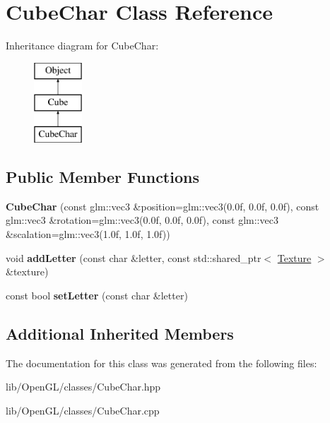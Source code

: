 \hypertarget{class_cube_char}{}\section{Cube\+Char Class Reference}
\label{class_cube_char}
Inheritance diagram for Cube\+Char\+:\begin{figure}[H]
\begin{center}
\leavevmode
\includegraphics[height=3.000000cm]{class_cube_char}
\end{center}
\end{figure}
\subsection*{Public Member Functions}
\begin{DoxyCompactItemize}
\item 
\mbox{\label{class_cube_char_af247c30c0f327f6324efd2218ea2cad3}} 
{\bfseries Cube\+Char} (const glm\+::vec3 \&position=glm\+::vec3(0.\+0f, 0.\+0f, 0.\+0f), const glm\+::vec3 \&rotation=glm\+::vec3(0.\+0f, 0.\+0f, 0.\+0f), const glm\+::vec3 \&scalation=glm\+::vec3(1.\+0f, 1.\+0f, 1.\+0f))
\item 
\mbox{\label{class_cube_char_af72a46c8682f3f0c42c3e2feb1a7dcc7}} 
void {\bfseries add\+Letter} (const char \&letter, const std\+::shared\+\_\+ptr$<$ \hyperlink{class_texture}{Texture} $>$ \&texture)
\item 
\mbox{\label{class_cube_char_a6e527b86d64f804c9088d9f05b58e172}} 
const bool {\bfseries set\+Letter} (const char \&letter)
\end{DoxyCompactItemize}
\subsection*{Additional Inherited Members}


The documentation for this class was generated from the following files\+:\begin{DoxyCompactItemize}
\item 
lib/\+Open\+G\+L/classes/Cube\+Char.\+hpp\item 
lib/\+Open\+G\+L/classes/Cube\+Char.\+cpp\end{DoxyCompactItemize}
